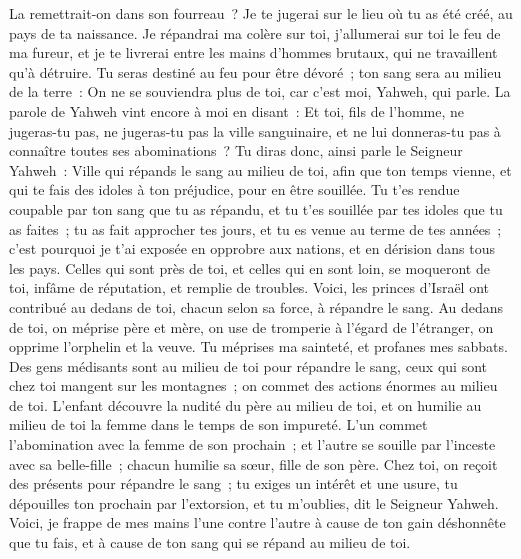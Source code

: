 \begin{multicols}{2}
La remettrait-on dans son fourreau~? Je te jugerai sur le lieu où tu as été créé, au pays de ta naissance.
Je répandrai ma colère sur toi, j'allumerai sur toi le feu de ma fureur, et je te livrerai entre les mains d'hommes brutaux, qui ne travaillent qu'à détruire.
Tu seras destiné au feu pour être dévoré~; ton sang sera au milieu de la terre~: On ne se souviendra plus de toi, car c'est moi, Yahweh, qui parle.
\VerseOne{}La parole de Yahweh vint encore à moi en disant~:
Et toi, fils de l'homme, ne jugeras-tu pas, ne jugeras-tu pas la ville sanguinaire, et ne lui donneras-tu pas à connaître toutes ses abominations~?
Tu diras donc, ainsi parle le Seigneur Yahweh~: Ville qui répands le sang au milieu de toi, afin que ton temps vienne, et qui te fais des idoles à ton préjudice, pour en être souillée.
Tu t'es rendue coupable par ton sang que tu as répandu, et tu t'es souillée par tes idoles que tu as faites~; tu as fait approcher tes jours, et tu es venue au terme de tes années~; c'est pourquoi je t'ai exposée en opprobre aux nations, et en dérision dans tous les pays.
Celles qui sont près de toi, et celles qui en sont loin, se moqueront de toi, infâme de réputation, et remplie de troubles.
Voici, les princes d'Israël ont contribué au dedans de toi, chacun selon sa force, à répandre le sang.
Au dedans de toi, on méprise père et mère, on use de tromperie à l'égard de l'étranger, on opprime l'orphelin et la veuve.
Tu méprises ma sainteté, et profanes mes sabbats.
Des gens médisants sont au milieu de toi pour répandre le sang, ceux qui sont chez toi mangent sur les montagnes~; on commet des actions énormes au milieu de toi.
L'enfant découvre la nudité du père au milieu de toi, et on humilie au milieu de toi la femme dans le temps de son impureté.
L'un commet l'abomination avec la femme de son prochain~; et l'autre se souille par l'inceste avec sa belle-fille~; chacun humilie sa sœur, fille de son père.
Chez toi, on reçoit des présents pour répandre le sang~; tu exiges un intérêt et une usure, tu dépouilles ton prochain par l'extorsion, et tu m'oublies, dit le Seigneur Yahweh.
Voici, je frappe de mes mains l'une contre l'autre à cause de ton gain déshonnête que tu fais, et à cause de ton sang qui se répand au milieu de toi.

\end{multicols}

